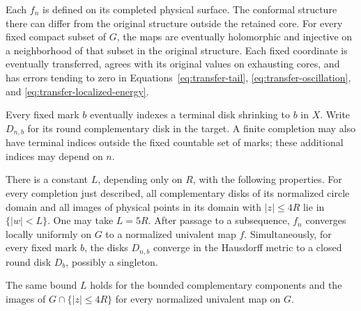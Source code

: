 Each $f_n$ is defined on its completed physical surface.  The conformal
structure there can differ from the original structure outside the
retained core.  For every fixed compact subset of $G$, the maps are
eventually holomorphic and injective on a neighborhood of that subset
in the original structure.  Each fixed coordinate is eventually
transferred, agrees with its original values on exhausting cores,
and has errors tending to zero in
Equations~\eqref{eq:transfer-tail},
\eqref{eq:transfer-oscillation}, and
\eqref{eq:transfer-localized-energy}.

Every fixed mark $b$ eventually indexes a terminal disk shrinking to
$b$ in $X$.  Write $D_{n,b}$ for its round complementary disk in the
target.  A finite completion may also have terminal indices outside
the fixed countable set of marks; these additional indices may depend
on $n$.

\begin{lemma}\label{lem:normalized-limits}
There is a constant $L$, depending only on $R$, with the following
properties.  For every completion just described, all complementary
disks of its normalized circle domain and all images of physical
points in its domain with $|z|\le4R$ lie in $\{|w|<L\}$.
One may take $L=5R$.
After passage to a subsequence, $f_n$ converges locally uniformly on
$G$ to a normalized univalent map $f$.  Simultaneously, for every
fixed mark $b$, the disks $D_{n,b}$ converge in the Hausdorff metric to
a closed round disk $D_b$, possibly a singleton.

The same bound $L$ holds for the bounded complementary components and
the images of $G\cap\{|z|\le4R\}$ for every normalized univalent map
on $G$.
\end{lemma}

